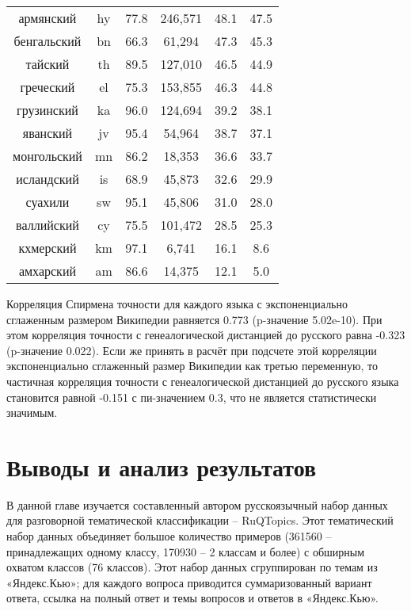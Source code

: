\begin{table*}[!htbp]
\begin{minipage}{0.5\textwidth}
{\begin{tabular}[baseline={(0,2.1)}]{|c|c|c|c|c|c|}
армянский & hy & 77.8 & 246,571 & 48.1 & 47.5\\
бенгальский & bn & 66.3 & 61,294 & 47.3 & 45.3\\
тайский & th & 89.5 & 127,010 & 46.5 & 44.9\\
греческий & el & 75.3 & 153,855 & 46.3 & 44.8\\
грузинский & ka & 96.0 & 124,694 & 39.2 & 38.1\\
яванский & jv & 95.4 & 54,964 & 38.7 & 37.1\\
монгольский & mn & 86.2 & 18,353 & 36.6 & 33.7\\
исландский & is & 68.9 & 45,873 & 32.6 & 29.9\\
суахили & sw & 95.1 & 45,806 & 31.0 & 28.0\\
валлийский & cy & 75.5 & 101,472 & 28.5 & 25.3\\
кхмерский & km & 97.1 & 6,741 & 16.1 & 8.6\\
амхарский & am & 86.6 & 14,375 & 12.1 & 5.0\\ \hline
\hline
\end{tabular}
}
\end{minipage}
\end{table*}

Корреляция Спирмена точности для каждого языка с экспоненциально сглаженным размером Википедии равняется 0.773 (p-значение 5.02e-10). При этом корреляция точности с генеалогической дистанцией до русского равна -0.323 (p-значение 0.022). Если же принять в расчёт при подсчете этой корреляции экспоненциально сглаженный размер Википедии как третью переменную, то частичная корреляция точности с генеалогической дистанцией до русского языка становится равной -0.151 с пи-значением 0.3, что не является статистически значимым.


\section{Выводы и анализ результатов} 

В данной главе изучается составленный автором русскоязычный набор данных для разговорной тематической классификации -- {RuQTopics}. Этот тематический набор данных объединяет большое количество примеров (361560 -- принадлежащих одному классу, 170930 -- 2 классам и более) с обширным охватом классов (76 классов). Этот набор данных сгруппирован по темам из «Яндекс.Кью»; для каждого вопроса приводится суммаризованный вариант ответа, ссылка на полный ответ и темы вопросов и ответов в «Яндекс.Кью».

